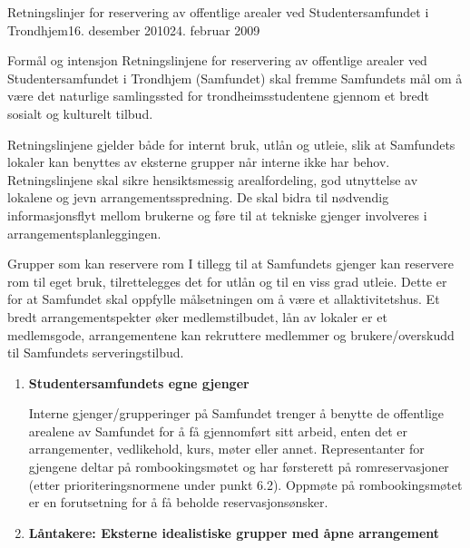 
\begin{instruks}{Retningslinjer for reservering av offentlige arealer
    ved Studentersamfundet i Trondhjem}{16. desember 2010}{24. februar 2009}

    \begin{instruksledd}{Formål og intensjon}
        Retningslinjene for reservering av offentlige arealer ved Studentersamfundet i Trondhjem
        (Samfundet) skal fremme
        Samfundets mål om å være det naturlige samlingssted for trondheimsstudentene gjennom et
        bredt sosialt og kulturelt tilbud.


        Retningslinjene gjelder både for internt bruk, utlån og utleie, slik at Samfundets lokaler
        kan benyttes av eksterne
        grupper når interne ikke har behov. Retningslinjene skal sikre hensiktsmessig
        arealfordeling, god utnyttelse av
        lokalene og jevn arrangementsspredning. De skal bidra til nødvendig informasjonsflyt
        mellom brukerne og føre til at
        tekniske gjenger involveres i arrangementsplanleggingen.
    \end{instruksledd}

    \begin{instruksledd}{Grupper som kan reservere rom}
        I tillegg til at Samfundets gjenger kan reservere rom til eget bruk,
        tilrettelegges det for utlån og til en viss grad utleie.
        Dette er for at Samfundet skal oppfylle målsetningen om å være et
        allaktivitetshus. Et bredt arrangementspekter øker
        medlemstilbudet, lån av lokaler er et medlemsgode, arrangementene kan rekruttere
        medlemmer og brukere/overskudd
        til Samfundets serveringstilbud.

        \begin{enumerate}
            \item \textbf{Studentersamfundets egne gjenger}

                Interne gjenger/grupperinger på Samfundet trenger å benytte de offentlige
                arealene av
                Samfundet for å få gjennomført sitt arbeid, enten det er arrangementer,
                vedlikehold, kurs,
                møter eller annet. Representanter for gjengene deltar på rombookingsmøtet
                og har førsterett
                på romreservasjoner (etter prioriteringsnormene under punkt 6.2). Oppmøte
                på
                rombookingsmøtet er en forutsetning for å få beholde reservasjonsønsker.

            \item \textbf{ Låntakere: Eksterne idealistiske grupper med åpne arrangement}


\end{enumerate}
\end{instruksledd}
\end{instruks}
